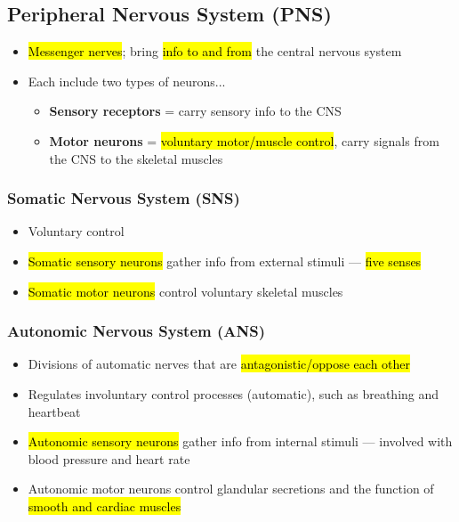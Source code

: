 \documentclass[a4paper,12pt]{article}
\begin{document}
\subsection{Peripheral Nervous System (PNS)}
\begin{itemize}
    \item{\hl{Messenger nerves}; bring \hl{info to and from} the central nervous system}
    \item{
            Each include two types of neurons...
            \begin{itemize}
                \item{\textbf{Sensory receptors} = carry sensory info to the CNS}
                \item{\textbf{Motor neurons} = \hl{voluntary motor/muscle control}, carry signals from the CNS to the skeletal muscles}
            \end{itemize}
        }

\end{itemize}

\subsubsection{Somatic Nervous System (SNS)}
\begin{itemize}
    \item{Voluntary control}
    \item{\hl{Somatic sensory neurons} gather info from external stimuli --- \hl{five senses}}
    \item{\hl{Somatic motor neurons} control voluntary skeletal muscles}
\end{itemize}

\subsubsection{Autonomic Nervous System (ANS)}
\begin{itemize}
    \item{Divisions of automatic nerves that are \hl{antagonistic/oppose each other}}
    \item{Regulates involuntary control processes (automatic), such as breathing and heartbeat}
    \item{\hl{Autonomic sensory neurons} gather info from internal stimuli --- involved with blood pressure and heart rate}
    \item{Autonomic motor neurons control glandular secretions and the function of \hl{smooth and cardiac muscles}}
\end{itemize}
\end{document}
